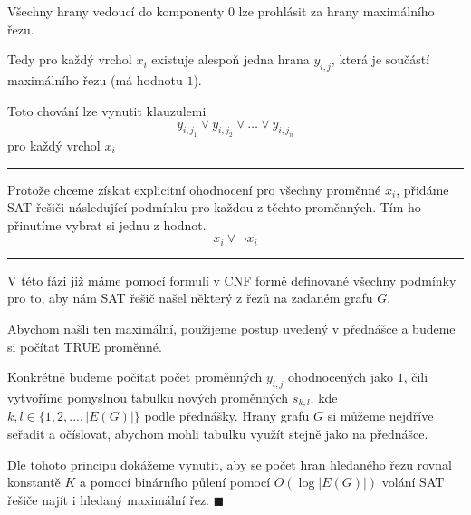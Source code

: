 \documentclass{article}
\begin{document}
Všechny hrany vedoucí do komponenty $0$ lze prohlásit za hrany maximálního řezu.

\vspace{5mm}
\vspace{5mm}
Tedy pro každý vrchol $x_i$ existuje alespoň jedna hrana $y_{i,j}$, která je součástí maximálního řezu (má hodnotu $1$).

\vspace{5mm}
Toto chování lze vynutit klauzulemi
\[\boxed{ y_{i,j_1} \vee y_{i,j_2} \vee \ldots \vee  y_{i,j_n}  }\]
pro každý vrchol $x_i$

\vspace{5mm}
\hrule\vspace{5mm}
Protože chceme získat explicitní ohodnocení pro všechny proměnné $x_i$, přidáme SAT řešiči následující podmínku pro každou z těchto proměnných.
Tím ho přinutíme vybrat si jednu z hodnot.
\[\boxed{ x_i \vee \neg x_i }\]

\vspace{5mm}
\hrule\vspace{5mm}
V této fázi již máme pomocí formulí v CNF formě definované všechny podmínky pro to, aby nám SAT řešič našel některý z řezů na zadaném grafu $G$.

\vspace{5mm}
\vspace{5mm}
Abychom našli ten maximální, použijeme postup uvedený v přednášce a budeme si počítat TRUE proměnné.

\vspace{5mm}
Konkrétně budeme počítat počet proměnných $y_{i,j}$ ohodnocených jako $1$, čili vytvoříme pomyslnou tabulku nových proměnných $s_{k,l}$, kde $k,l \in \{1,2,...,|E(G)|\}$ podle přednášky.
Hrany grafu $G$ si můžeme nejdříve seřadit a očíslovat, abychom mohli tabulku využít stejně jako na přednášce.

\vspace{5mm}
Dle tohoto principu dokážeme vynutit, aby se počet hran hledaného řezu rovnal konstantě $K$ a pomocí binárního půlení pomocí $O(\log |E(G)|)$ volání SAT řešiče najít i hledaný maximální řez.
$\blacksquare$
\end{document}
